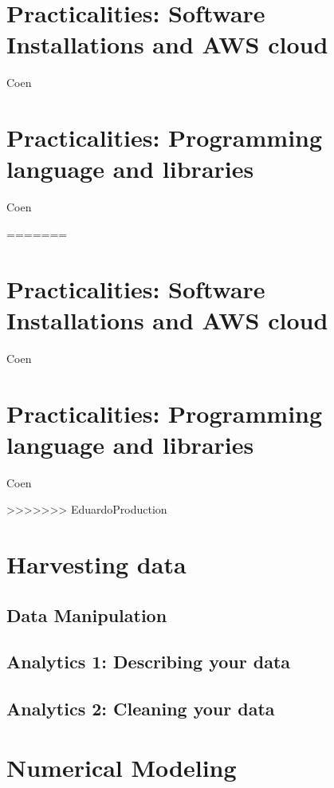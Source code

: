 \documentclass[10pt]{PhDthesisPSnPDF}%
\begin{document}
\chapter{Practicalities: Software Installations and AWS cloud}\label{P1}

Coen

\chapter{Practicalities: Programming language and libraries}\label{P2}

Coen


=======


\chapter{Practicalities: Software Installations and AWS cloud}\label{P1}

Coen

\chapter{Practicalities: Programming language and libraries}\label{P2}

Coen


>>>>>>> EduardoProduction
\chapter{Harvesting data}\label{harvesting}

\section{Data Manipulation}\label{dataM} 


\section{Analytics 1: Describing your data}\label{Analy.1}

\section{Analytics 2: Cleaning your data}\label{Analy.2}
 



\chapter{Numerical Modeling}\label{numerics}
\end{document}
